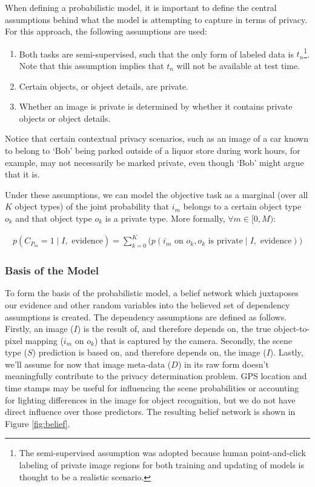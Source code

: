 \documentclass[11pt]{article}
\begin{document}
When defining a probabilistic model, it is important to define the central assumptions behind what the model is attempting to capture in terms of privacy. For this approach, the following assumptions are used: 

\begin{enumerate}
    \item Both tasks are semi-supervised, such that the only form of labeled data is $t_n$\footnote{The semi-supervised assumption was adopted because human point-and-click labeling of private image regions for both training and updating of models is thought to be a realistic scenario.}.  Note that this assumption implies that $t_n$ will not be available at test time.
    \item Certain objects, or object details, are private.
    \item Whether an image is private is determined by whether it contains private objects or object details.
\end{enumerate}

Notice that certain contextual privacy scenarios, such as an image of a car known to belong to `Bob' being parked outside of a liquor store during work hours, for example, may not necessarily be marked private, even though `Bob' might argue that it is.

Under these assumptions, we can model the objective task as a marginal (over all $K$ object types) of the joint probability that $i_m$ belongs to a certain object type $o_k$ and that object type $o_k$ is a private type. More formally, $\forall m \in \lbrack0,M)$:

\begin{align}\label{eqn:task1.0}
    p(C_{P_{m}} = 1 \mid I, \textrm{ evidence}) = \sum_{k = 0}^{K} \Big( p(i_m \textrm{ on } o_k, o_k \textrm{ is private} \mid I, \textrm{ evidence}) \Big)
\end{align}

\subsubsection{Basis of the Model}

To form the basis of the probabilistic model, a belief network which juxtaposes our evidence and other random variables into the believed set of dependency assumptions is created. The dependency assumptions are defined as follows.  Firstly, an image ($I$) is the result of, and therefore depends on, the true object-to-pixel mapping ($i_m$ on $o_k$) that is captured by the camera.  Secondly, the scene type ($S$) prediction is based on, and therefore depends on, the image ($I$).  Lastly, we'll assume for now that image meta-data ($D$) in its raw form doesn't meaningfully contribute to the privacy determination problem.  GPS location and time stamps may be useful for influencing the scene probabilities or accounting for lighting differences in the image for object recognition, but we do not have direct influence over those predictors.  The resulting belief network is shown in Figure \ref{fig:belief}.
\end{document}
